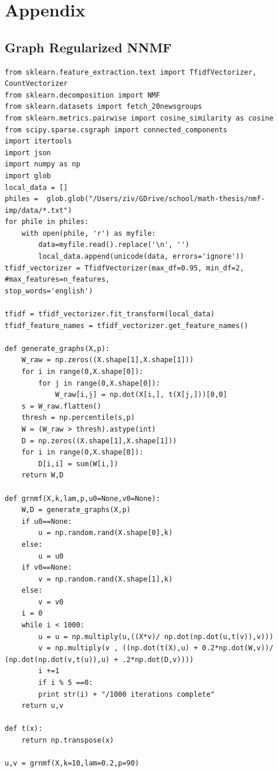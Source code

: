 \documentclass[12pt]{pom_thesis}
\begin{document}
\section*{Appendix}
\subsection*{Graph Regularized NNMF}
\begin{lstlisting}
from sklearn.feature_extraction.text import TfidfVectorizer, CountVectorizer
from sklearn.decomposition import NMF
from sklearn.datasets import fetch_20newsgroups
from sklearn.metrics.pairwise import cosine_similarity as cosine
from scipy.sparse.csgraph import connected_components
import itertools
import json
import numpy as np
import glob
local_data = []
philes =  glob.glob("/Users/ziv/GDrive/school/math-thesis/nmf-imp/data/*.txt")
for phile in philes:
	with open(phile, 'r') as myfile:
		data=myfile.read().replace('\n', '')
		local_data.append(unicode(data, errors='ignore'))
tfidf_vectorizer = TfidfVectorizer(max_df=0.95, min_df=2, #max_features=n_features,
stop_words='english')

tfidf = tfidf_vectorizer.fit_transform(local_data)
tfidf_feature_names = tfidf_vectorizer.get_feature_names()

def generate_graphs(X,p):
	W_raw = np.zeros((X.shape[1],X.shape[1]))
	for i in range(0,X.shape[0]):
		for j in range(0,X.shape[0]):
			W_raw[i,j] = np.dot(X[i,], t(X[j,]))[0,0]
	s = W_raw.flatten()
	thresh = np.percentile(s,p)
	W = (W_raw > thresh).astype(int)
	D = np.zeros((X.shape[1],X.shape[1]))
	for i in range(0,X.shape[0]):
		D[i,i] = sum(W[i,])
	return W,D
	
def grnmf(X,k,lam,p,u0=None,v0=None):
	W,D = generate_graphs(X,p)
	if u0==None: 
		u = np.random.rand(X.shape[0],k)
	else:
		u = u0
	if v0==None:
		v = np.random.rand(X.shape[1],k)
	else:
		v = v0
	i = 0    
	while i < 1000:
		u = u = np.multiply(u,((X*v)/ np.dot(np.dot(u,t(v)),v)))
		v = np.multiply(v , ((np.dot(t(X),u) + 0.2*np.dot(W,v))/ (np.dot(np.dot(v,t(u)),u) + .2*np.dot(D,v))))
		i +=1
		if i % 5 ==0:
		print str(i) + "/1000 iterations complete"
	return u,v
	
def t(x):
	return np.transpose(x)
	
u,v = grnmf(X,k=10,lam=0.2,p=90)
\end{lstlisting}
\end{document}
